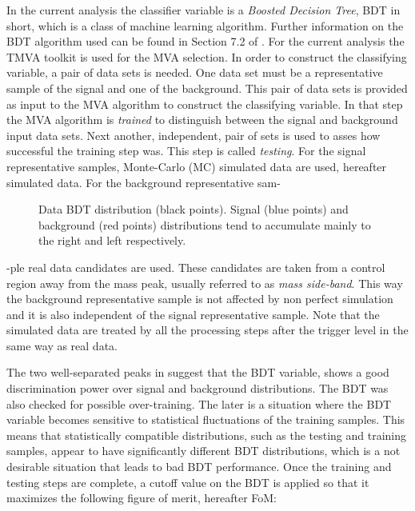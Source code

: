 In the current analysis the classifier variable is a {\it Boosted Decision Tree}, BDT in short, which is a class
of machine learning  algorithm. Further information on the BDT algorithm used can be found in Section 7.2 of \cite{TMVA}.
For the current analysis the TMVA toolkit \cite{TMVA} is used for the MVA selection. In order to construct the classifying variable,
a pair of data sets is needed. One data set must be a representative sample of the signal and one of the background.
This pair of data sets is provided as input to the MVA algorithm to construct the classifying variable.
In that step the MVA algorithm is {\it trained} to distinguish between the signal and background input data sets.
Next another, independent, pair of sets is used to asses how successful the training step was. This step is called {\it testing}.
For the signal representative samples, \BsJpsiKst Monte-Carlo (MC) simulated data are used, hereafter simulated data.
For the background representative sam-

\begin{figure}[!t]
\centering
  \scalebox{1}{}
  \caption{Data BDT distribution (black points). Signal (blue points) and background (red points) distributions
           tend to accumulate mainly to the right and left respectively.}
  \label{BTDG_performance}
\end{figure}

\noindent -ple real data candidates are used. These candidates are taken from a control
region away from the \BsJpsiKst mass peak, usually referred to as {\it mass side-band}. This way the background representative sample
is not affected by non perfect simulation and it is also independent of the signal representative sample.
Note that the simulated data are treated by all the processing steps after the \lzero trigger level in the same way as real data.

The two well-separated peaks in  suggest that the BDT variable, shows a good discrimination
power over signal and background distributions. The BDT was also checked for possible over-training. The later is a
situation where the BDT variable becomes sensitive to statistical fluctuations of the training samples.
This means that statistically compatible distributions, such as the testing and training samples,
appear to have significantly different BDT distributions, which is a not desirable situation that leads to
bad BDT performance. Once the training and testing steps are complete, a cutoff value on the BDT is applied
so that it maximizes the following figure of merit, hereafter FoM:

